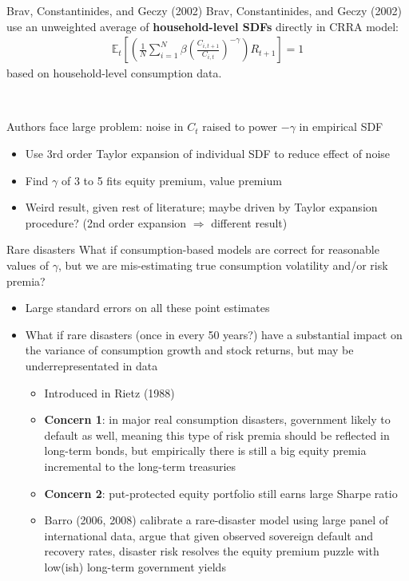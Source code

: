 \documentclass[xcolor=table, aspectratio=169]{beamer}
\newcommand{\E}{\mathbb{E}}
\newcommand{\alertbf}[1]{\alert{\textbf{#1}}}
\begin{document}
\begin{frame}{Brav, Constantinides, and Geczy (2002)}
Brav, Constantinides, and Geczy (2002) use an unweighted average of \alertbf{household-level SDFs} directly in CRRA model:
\begin{align*}
\E_t \left[ \left( \frac{1}{N} \sum_{i=1}^N \beta \left( \frac{C_{i,t+1}}{C_{i,t}} \right)^{-\gamma} \right) R_{t+1} \right] = 1
\end{align*}
based on household-level consumption data.

~

Authors face large problem: noise in $C_t$ raised to power $-\gamma$ in empirical SDF
\begin{itemize}
\item Use 3rd order Taylor expansion of individual SDF to reduce effect of noise
\item Find $\gamma$ of 3 to 5 fits equity premium, value premium
\item Weird result, given rest of literature; maybe driven by Taylor expansion procedure? (2nd order expansion $\Rightarrow$ different result)
\end{itemize}
\end{frame}

\begin{frame}{Rare disasters}
What if consumption-based models are correct for reasonable values of $\gamma$, but we are mis-estimating true consumption volatility and/or risk premia?
\begin{itemize}
\item Large standard errors on all these point estimates 
\item What if rare disasters (once in every 50 years?) have a substantial impact on the variance of consumption growth and stock returns, but may be underrepresentated in data
\begin{itemize}
\item Introduced in Rietz (1988)
\item \alertbf{Concern 1}: in major real consumption disasters, government likely to default as well, meaning this type of risk premia should be reflected in long-term bonds, but empirically there is still a big equity premia incremental to the long-term treasuries
\item \alertbf{Concern 2}: put-protected equity portfolio still earns large Sharpe ratio
\item Barro (2006, 2008) calibrate a rare-disaster model using large panel of international data, argue that given observed sovereign default and recovery rates, disaster risk resolves the equity premium puzzle with  low(ish) long-term government yields
\end{itemize}
\end{itemize}
\end{frame}
\end{document}
